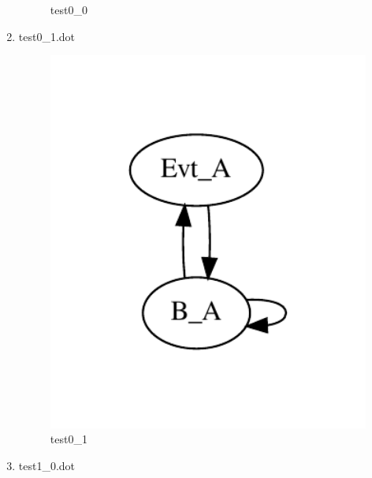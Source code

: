\documentclass[12pt,a4paper]{report}
\begin{document}
\begin{enumerate}
\begin{figure}
        \caption{test0\_0}
        \label{fig:test0_0}
    \end{figure}
\item test0\_1.dot
    \begin{figure}
        \centering 
        \includegraphics*[width=1.0\textwidth,keepaspectratio]{TestPattern/test0_1.pdf}
        \caption{test0\_1}
        \label{fig:test0_1}
    \end{figure}
\item test1\_0.dot
    \begin{figure}
        \centering 

\end{figure}
\end{enumerate}
\end{document}
